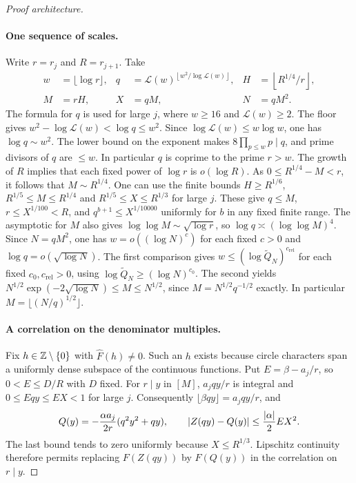 \begin{proof}[Proof architecture]
\leanok
\paragraph{One sequence of scales.}
Write $r=r_j$ and $R=r_{j+1}$. Take
\[
 \begin{aligned}
 w&=\lfloor\log r\rfloor,&
 q&=\mathcal L(w)^{\left\lfloor w^2/\log\mathcal L(w)\right\rfloor},&
 H&=\left\lfloor R^{1/4}/r\right\rfloor,\\
 M&=rH,& X&=qM,& N&=qM^2.
 \end{aligned}
\]
The formula for $q$ is used for large $j$, where $w\ge16$ and
$\mathcal L(w)\ge2$. The floor gives $w^2-\log\mathcal L(w)<\log q
\le w^2$. Since $\log\mathcal L(w)\le w\log w$, one has
$\log q\sim w^2$. The lower bound on the exponent makes
$8\prod_{p\le w}p\mid q$, and prime divisors of $q$ are $\le w$.
In particular $q$ is coprime to the prime $r>w$.
The growth of $R$ implies that each fixed power of $\log r$ is
$o(\log R)$. As $0\le R^{1/4}-M<r$, it follows that
$M\sim R^{1/4}$. One can use the finite bounds
$H\ge R^{1/6}$, $R^{1/5}\le M\le R^{1/4}$ and
$R^{1/5}\le X\le R^{1/3}$ for large $j$. These give $q\le M$,
$r\le X^{1/100}<R$, and $q^{b+1}\le X^{1/10000}$ uniformly
for $b$ in any fixed finite range. The asymptotic for $M$ also gives $\log\log M\sim\sqrt{\log r}$,
so $\log q\asymp(\log\log M)^4$. Since $N=qM^2$, one has
$w=o((\log N)^c)$ for each fixed $c>0$ and
$\log q=o(\sqrt{\log N})$. The first comparison gives
$w\le(\log\widetilde Q_N)^{c_{\mathrm{rel}}}$ for each fixed
$c_0,c_{\mathrm{rel}}>0$, using $\log\widetilde Q_N\ge(\log N)^{c_0}$.
The second yields $N^{1/2}\exp(-2\sqrt{\log N})\le M\le N^{1/2}$,
since $M=N^{1/2}q^{-1/2}$ exactly. In particular
$M=\lfloor(N/q)^{1/2}\rfloor$.

\paragraph{A correlation on the denominator multiples.}
Fix $h\in\mathbb Z\setminus\{0\}$ with $\widehat F(h)\ne0$. Such an $h$
exists because circle characters span a uniformly dense subspace
of the continuous functions. Put $E=\beta-a_j/r$, so
$0<E\le D/R$ with $D$ fixed. For $r\mid y$ in $[M]$,
$a_j qy/r$ is integral and $0\le E qy\le E X<1$ for large $j$.
Consequently $\lfloor\beta qy\rfloor=a_j qy/r$, and
\[
 Q(y)=-\frac{\alpha a_j}{2r}(q^2y^2+qy),\qquad
 |Z(qy)-Q(y)|\le \frac{\lvert\alpha\rvert}2 E X^2.
\]
The last bound tends to zero uniformly because $X\le R^{1/3}$.
Lipschitz continuity therefore permits replacing $F(Z(qy))$
by $F(Q(y))$ in the correlation on $r\mid y$.


\end{proof}
